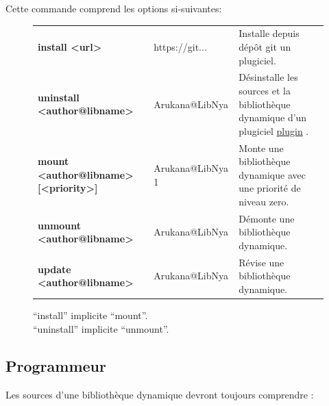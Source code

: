\documentclass{report}
\begin{document}
Cette commande comprend les options si-suivantes:
\begin{figure}[!ht]
    \begin{minipage}{\textwidth}
    \centering
		\begin{tabular}{p{}p{}p{}}
			\textbf{install <url>} & https://git... & Installe depuis dépôt git un plugiciel. \\
			\textbf{uninstall <author@libname>} & Arukana@LibNya & Désinstalle les sources et la bibliothèque dynamique d'un plugiciel \textendash{} \href{https://fr.wikipedia.org/wiki/Plugin}{plugin} \textendash{}. \\
			\textbf{mount <author@libname> [<priority>]} & Arukana@LibNya 1 & Monte une bibliothèque dynamique avec une priorité de niveau zero. \\
			\textbf{unmount <author@libname>} & Arukana@LibNya & Démonte une bibliothèque dynamique. \\
			\textbf{update <author@libname>} & Arukana@LibNya & Révise une bibliothèque dynamique. \\
		\end{tabular}
    \end{minipage}
    \caption[Caption] {
		\enquote{install} implicite \enquote{mount}. \\
		\enquote{uninstall} implicite \enquote{unmount}.
    }
\end{figure}

\subsection{Programmeur}

Les sources d'une bibliothèque dynamique devront toujours comprendre : \\
\end{document}
